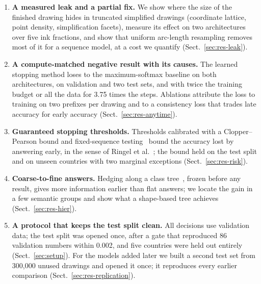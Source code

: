 \begin{enumerate}
\item \textbf{A measured leak and a partial fix.} We show where the size of the finished drawing
hides in truncated simplified drawings (coordinate lattice, point density, simplification
facets), measure its effect on two architectures over five ink fractions, and show that uniform
arc-length resampling removes most of it for a sequence model, at a cost we quantify
(Sect.~\ref{sec:res-leak}).
\item \textbf{A compute-matched negative result with its causes.} The learned stopping method
loses to the maximum-softmax baseline on both architectures, on validation and two test sets,
and with twice the training budget or all the data for 3.75 times the steps. Ablations attribute the loss to training on two prefixes per drawing
and to a consistency loss that trades late accuracy for early accuracy
(Sect.~\ref{sec:res-anytime}).
\item \textbf{Guaranteed stopping thresholds.} Thresholds calibrated with a Clopper--Pearson
bound and fixed-sequence testing~\cite{clopper1934,angelopoulos2021ltt} bound the accuracy lost by
answering early, in the sense of Ringel et al.~\cite{ringel2024early}; the bound held on the test
split and on unseen countries with two marginal exceptions (Sect.~\ref{sec:res-risk}).
\item \textbf{Coarse-to-fine answers.} Hedging along a class tree~\cite{deng2012hedging}, frozen
before any result, gives more information earlier than flat answers; we locate the gain in a few
semantic groups and show what a shape-based tree achieves (Sect.~\ref{sec:res-hier}).
\item \textbf{A protocol that keeps the test split clean.} All decisions use validation data;
the test split was opened once, after a gate that reproduced 86 validation numbers within
0.002, and five countries were held out entirely (Sect.~\ref{sec:setup}). For the models added
later we built a second test set from 300{,}000 unused drawings and opened it once; it reproduces
every earlier comparison (Sect.~\ref{sec:res-replication}).
\end{enumerate}
